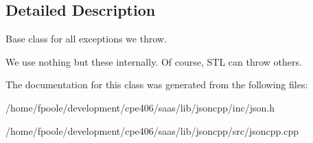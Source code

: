 \subsection{Detailed Description}
Base class for all exceptions we throw.

We use nothing but these internally. Of course, S\+T\+L can throw others. 

The documentation for this class was generated from the following files\+:\begin{DoxyCompactItemize}
\item 
/home/fpoole/development/cpe406/saas/lib/jsoncpp/inc/json.\+h\item 
/home/fpoole/development/cpe406/saas/lib/jsoncpp/src/jsoncpp.\+cpp\end{DoxyCompactItemize}
